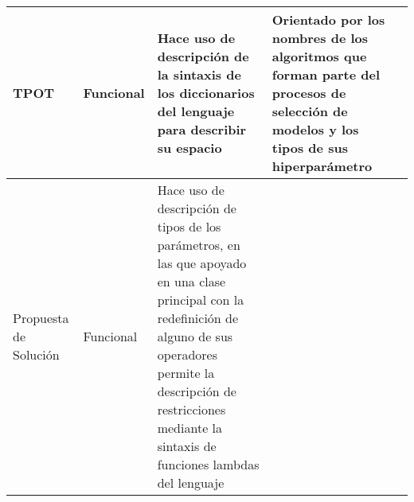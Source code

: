\begin{longtable}{  p{2.15cm}  p{2.4cm}  p{4.75cm}  p{4.65cm}  p{5.45cm} }
    \hline
    TPOT                                                                                                                                                                                                                                                                                                                         &
    Funcional                                                                                                                                                                                                                                                                                                                    &
    Hace uso de descripción de la sintaxis de los diccionarios del lenguaje para describir su espacio                                                                                                                                                                                                                            &
    Orientado por los nombres de los algoritmos que forman parte del procesos de selección de modelos y los tipos de sus hiperparámetro                                                                                                                                                                                          &
    \\
    \hline
    \rowcolor{lavender}
    Propuesta de Solución                                                                                                                                                                                                                                                                                                        &
    Funcional                                                                                                                                                                                                                                                                                                                    &
    Hace uso de descripción de tipos de los parámetros, en las que apoyado en una clase principal con la redefinición de alguno de sus operadores permite la descripción de restricciones mediante la sintaxis de funciones lambdas del lenguaje                                                                                 &

\end{longtable}
